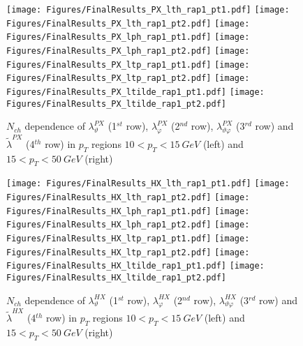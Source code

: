 \documentclass[12pt]{article}
\newcommand{\lamthHX}{\lambda^{\scriptscriptstyle HX}_\vartheta}
\newcommand{\lamphHX}{\lambda^{\scriptscriptstyle HX}_\varphi}
\newcommand{\lamthphHX}{\lambda^{\scriptscriptstyle HX}_{\vartheta \varphi}}
\newcommand{\lamtildeHX}{\tilde{\lambda}^{\scriptscriptstyle HX}}
\newcommand{\lamthPX}{\lambda^{\scriptscriptstyle PX}_\vartheta}
\newcommand{\lamphPX}{\lambda^{\scriptscriptstyle PX}_\varphi}
\newcommand{\lamthphPX}{\lambda^{\scriptscriptstyle PX}_{\vartheta \varphi}}
\newcommand{\lamtildePX}{\tilde{\lambda}^{\scriptscriptstyle PX}}
\begin{document}



\begin{figure}[htbp]
\centering
\texttt{[image: Figures/FinalResults\_PX\_lth\_rap1\_pt1.pdf]}
\texttt{[image: Figures/FinalResults\_PX\_lth\_rap1\_pt2.pdf]}
\texttt{[image: Figures/FinalResults\_PX\_lph\_rap1\_pt1.pdf]}
\texttt{[image: Figures/FinalResults\_PX\_lph\_rap1\_pt2.pdf]}
\texttt{[image: Figures/FinalResults\_PX\_ltp\_rap1\_pt1.pdf]}
\texttt{[image: Figures/FinalResults\_PX\_ltp\_rap1\_pt2.pdf]}
\texttt{[image: Figures/FinalResults\_PX\_ltilde\_rap1\_pt1.pdf]}
\texttt{[image: Figures/FinalResults\_PX\_ltilde\_rap1\_pt2.pdf]}
\caption{$N_{ch}$ dependence of $\lamthPX$
(1$^{st}$ row), $\lamphPX$ (2$^{nd}$ row), $\lamthphPX$ (3$^{rd}$ row) and 
$\lamtildePX$ (4$^{th}$ row) in $p_T$ regions $10 < p_T < 15\ GeV$ (left) and
$15 < p_T < 50\ GeV$ (right)}
\end{figure}
\clearpage







\begin{figure}[htbp]
\centering
\texttt{[image: Figures/FinalResults\_HX\_lth\_rap1\_pt1.pdf]}
\texttt{[image: Figures/FinalResults\_HX\_lth\_rap1\_pt2.pdf]}
\texttt{[image: Figures/FinalResults\_HX\_lph\_rap1\_pt1.pdf]}
\texttt{[image: Figures/FinalResults\_HX\_lph\_rap1\_pt2.pdf]}
\texttt{[image: Figures/FinalResults\_HX\_ltp\_rap1\_pt1.pdf]}
\texttt{[image: Figures/FinalResults\_HX\_ltp\_rap1\_pt2.pdf]}
\texttt{[image: Figures/FinalResults\_HX\_ltilde\_rap1\_pt1.pdf]}
\texttt{[image: Figures/FinalResults\_HX\_ltilde\_rap1\_pt2.pdf]}
\caption{$N_{ch}$ dependence of $\lamthHX$
(1$^{st}$ row), $\lamphHX$ (2$^{nd}$ row), $\lamthphHX$ (3$^{rd}$ row) and 
$\lamtildeHX$ (4$^{th}$ row) in $p_T$ regions $10 < p_T < 15\ GeV$ (left) and
$15 < p_T < 50\ GeV$ (right)}
\end{figure}
\clearpage



\end{document}
